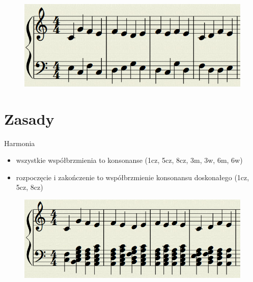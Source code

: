 \documentclass{beamer}
\begin{document}
\begin{frame}
	\begin{figure}
	   \includegraphics[scale=0.4]{images/przyklad.png}
	\end{figure}
\end{frame}

\section{Zasady}

\begin{frame}
	Harmonia
	\begin{itemize}
		\item wszystkie współbrzmienia to konsonanse (1cz, 5cz, 8cz, 3m, 3w, 6m, 6w)
		\item rozpoczęcie i zakończenie to współbrzmienie konsonansu doskonałego (1cz, 5cz, 8cz)
	\end{itemize}
	\begin{figure}
	   \includegraphics[scale=0.3]{images/kontrapunkt_mozliwosci.png}
	\end{figure}
\end{frame}
\end{document}
